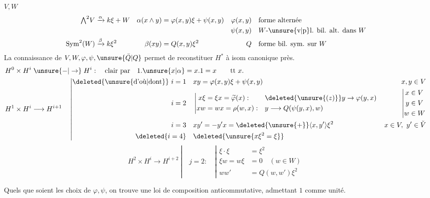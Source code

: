 $V,W$
\[
\begin{aligned}
{\textstyle\bigwedge}^{2}V&\xrightarrow{\alpha}k\xi+W&
\alpha(x\wedge y)&=\varphi(x,y)\xi+\psi(x,y)&
\varphi(x,y)&\quad\text{forme alternée}\\
&&&&\psi(x,y)&\quad\text{$W$-\unsure{v|p}l. bil. alt. dans $W$}\\
\operatorname{Sym}^{2}(W)&\xrightarrow{\beta}k\xi^2&
\beta(xy)&=Q(x,y)\xi^2&
Q&\quad\text{forme bil. sym. sur $W$}
\end{aligned}
\]
 La connaissance de $V,W,\varphi,\psi,\unsure{\bar Q|Q}$ permet de reconstituer $H^*$ à isom canonique près.
\[
\begin{aligned}
H^0\times H^i&\mathrel{\unsure{-|\to}}H^i:\quad\text{clair par}\quad 1.\unsure{x|\alpha}=x.1=x\qquad\text{tt }x.\\
H^1\times H^i&\longrightarrow H^{i+1}\quad\left|
\begin{aligned}
\deleted{\unsure{\text{d'où}|\text{dont}}}\ i=1\quad &xy=\varphi(x,y)\xi+\psi(x,y) &x,y\in V\\
i=2\quad &\left|\begin{aligned}
x\xi&=\xi x=\widetilde\varphi(x): &&\deleted{\unsure{(z)}}y\to\varphi(y,x)\\
xw&=wx=\rho(w,x):&&y\longrightarrow Q(\psi(y,x),w)
\end{aligned}\right. &\left|\begin{aligned}x&\in V\\y&\in V\\w&\in W\end{aligned}\right.\\
i=3\quad &xy'=-y'x=\deleted{\unsure{+}}\langle x,y'\rangle\xi^2 &x\in V,\ y'\in\check V\\
\deleted{i=4}\quad &\deleted{\unsure{x\xi^2=\xi}}
\end{aligned}\right.
\end{aligned}
\]
\[
H^2\times H^i\longrightarrow H^{i+2}\ \left|\quad j=2:\quad
\left|\begin{aligned}
\xi\cdot\xi&=\xi^2\\
\xi w=w\xi&=0\quad(w\in W)\\
ww'&=Q(w,w')\xi^2
\end{aligned}\right.\right.
\]

Quels que soient les choix de $\varphi,\psi$, on trouve une loi de composition anticommutative, admettant $1$ comme unité.

